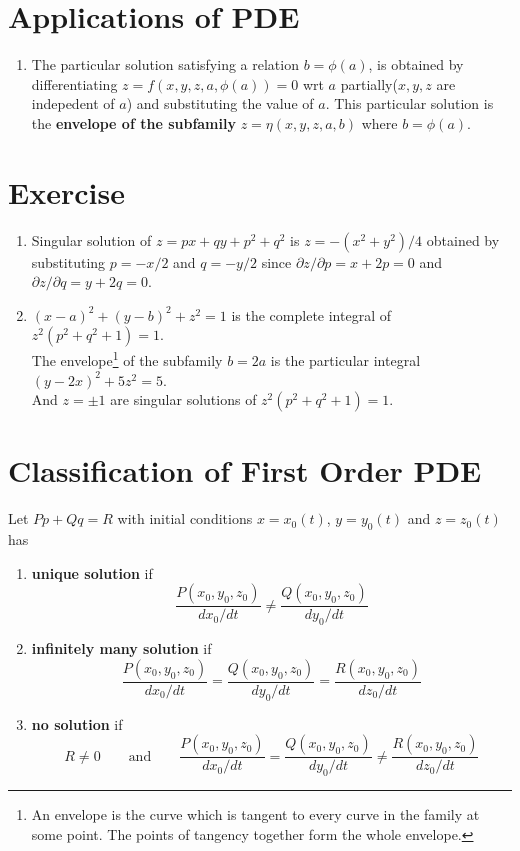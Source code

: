 \section{Applications of PDE}
\begin{enumerate}
	\item The particular solution satisfying a relation  $b = \phi(a)$, is obtained by differentiating $z= f(x,y,z,a,\phi(a)) = 0$ wrt $a$ partially($x,y,z$ are indepedent of $a$) and substituting the value of $a$. This particular solution is the \textbf{envelope of the subfamily} $z = \eta(x,y,z,a,b)$ where $b=\phi(a)$.
\end{enumerate}
\section{Exercise}
\begin{enumerate}
	\item Singular solution of $z = px + qy + p^2 + q^2$ is $z = -(x^2+y^2)/4$ obtained by substituting $p = -x/2$ and $q = -y/2$ since $\partial z/\partial p = x + 2p = 0$ and $\partial z/\partial q = y + 2q = 0$.
	\item $(x-a)^2 + (y-b)^2 + z^2 = 1$ is the complete integral of $z^2(p^2+q^2+1) = 1$. \\
	The envelope\footnote{An envelope is the curve which is tangent to every curve in the family at some point. The points of tangency together form the whole envelope.} of the subfamily $b = 2a$ is  the particular integral $(y-2x)^2+5z^2 = 5$.\\
	And $z = \pm 1$ are singular solutions of $z^2(p^2+q^2+1) = 1$.
\end{enumerate}

\section{Classification of First Order PDE}
Let $Pp + Qq = R$ with initial conditions $x = x_0(t)$, $y = y_0(t)$ and $z = z_0(t)$ has
\begin{enumerate}
	\item \textbf{unique solution} if $$\frac{P(x_0,y_0,z_0)}{dx_0/dt} \ne \frac{Q(x_0,y_0,z_0)}{dy_0/dt}$$
	\item \textbf{infinitely many solution} if $$\frac{P(x_0,y_0,z_0)}{dx_0/dt} = \frac{Q(x_0,y_0,z_0)}{dy_0/dt} = \frac{R(x_0,y_0,z_0)}{dz_0/dt}$$
	\item \textbf{no solution} if $$R \ne 0 \qquad \text{and}\qquad \frac{P(x_0,y_0,z_0)}{dx_0/dt} = \frac{Q(x_0,y_0,z_0)}{dy_0/dt} \ne \frac{R(x_0,y_0,z_0)}{dz_0/dt}$$
\end{enumerate}
